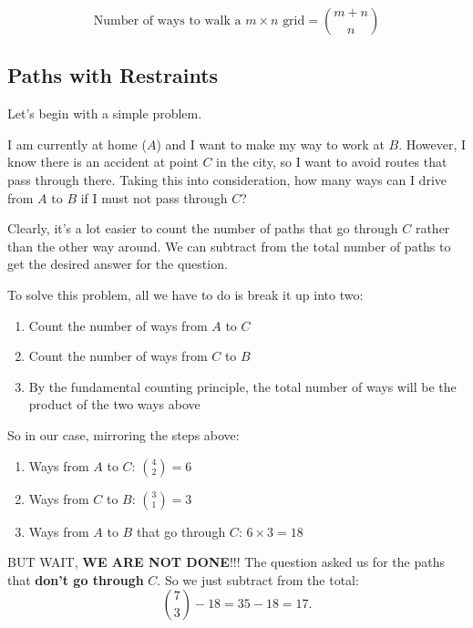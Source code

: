 		$$\boxed{\text{Number of ways to walk a } m\times n \text{ grid} = \binom{m + n}{n}}$$
		
	\subsection{Paths with Restraints}			
	    Let's begin with a simple problem.

	    \begin{problem}
		 I am currently at home ($A$) and I want to make my way to work at $B$. However, I know there is an accident at point $C$ in the city, so I want to avoid routes that pass through there. Taking this into consideration, how many ways can I drive from $A$ to $B$ if I must not pass through $C$?
		 \begin{center}
        \end{center}
		 \end{problem}

		Clearly, it's a lot easier to count the number of paths that go through $C$ rather than the other way around. We can subtract from the total number of paths to get the desired answer for the question.
		
		To solve this problem, all we have to do is break it up into two:
		\begin{enumerate}
		    \item Count the number of ways from $A$ to $C$
		    \item Count the number of ways from $C$ to $B$
		    \item By the fundamental counting principle, the total number of ways will be the product of the two ways above
		\end{enumerate}
        
        So in our case, mirroring the steps above:
        \begin{enumerate}
		    \item Ways from $A$ to $C$: $\binom{4}{2} = 6$
		    \item Ways from $C$ to $B$: $\binom{3}{1} = 3$
		    \item Ways from $A$ to $B$ that go through $C$: $6\times 3 = 18$
		\end{enumerate}
		BUT WAIT, \textbf{WE ARE NOT DONE}!!! The question asked us for the paths that \textbf{don't go through} $C$. So we just subtract from the total:
		$$\binom{7}{3} - 18 = 35-18 = \boxed{17}.$$

